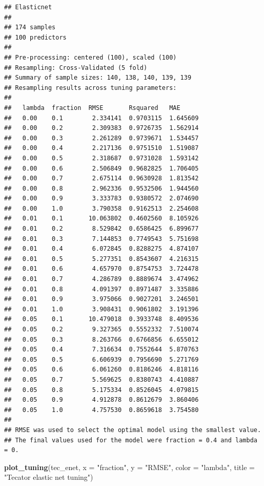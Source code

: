 \documentclass[
  11pt,
]{article}
\newenvironment{Shaded}{\begin{snugshade}}{\end{snugshade}}
\newcommand{\AttributeTok}[1]{\textcolor[rgb]{0.13,0.29,0.53}{#1}}
\newcommand{\FunctionTok}[1]{\textcolor[rgb]{0.13,0.29,0.53}{\textbf{#1}}}
\newcommand{\NormalTok}[1]{#1}
\newcommand{\StringTok}[1]{\textcolor[rgb]{0.31,0.60,0.02}{#1}}
\begin{document}
\begin{verbatim}
## Elasticnet 
## 
## 174 samples
## 100 predictors
## 
## Pre-processing: centered (100), scaled (100) 
## Resampling: Cross-Validated (5 fold) 
## Summary of sample sizes: 140, 138, 140, 139, 139 
## Resampling results across tuning parameters:
## 
##   lambda  fraction  RMSE       Rsquared   MAE     
##   0.00    0.1        2.334141  0.9703115  1.645609
##   0.00    0.2        2.309383  0.9726735  1.562914
##   0.00    0.3        2.261289  0.9739671  1.534457
##   0.00    0.4        2.217136  0.9751510  1.519087
##   0.00    0.5        2.318687  0.9731028  1.593142
##   0.00    0.6        2.506849  0.9682825  1.706405
##   0.00    0.7        2.675114  0.9630928  1.813542
##   0.00    0.8        2.962336  0.9532506  1.944560
##   0.00    0.9        3.333783  0.9380572  2.074690
##   0.00    1.0        3.790358  0.9162513  2.254608
##   0.01    0.1       10.063802  0.4602560  8.105926
##   0.01    0.2        8.529842  0.6586425  6.899677
##   0.01    0.3        7.144853  0.7749543  5.751698
##   0.01    0.4        6.072845  0.8288275  4.874107
##   0.01    0.5        5.277351  0.8543607  4.216315
##   0.01    0.6        4.657970  0.8754753  3.724478
##   0.01    0.7        4.286789  0.8889674  3.474962
##   0.01    0.8        4.091397  0.8971487  3.335886
##   0.01    0.9        3.975066  0.9027201  3.246501
##   0.01    1.0        3.908431  0.9061802  3.191396
##   0.05    0.1       10.479018  0.3933748  8.409536
##   0.05    0.2        9.327365  0.5552332  7.510074
##   0.05    0.3        8.263766  0.6766856  6.655012
##   0.05    0.4        7.316634  0.7552644  5.870763
##   0.05    0.5        6.606939  0.7956690  5.271769
##   0.05    0.6        6.061260  0.8186246  4.818116
##   0.05    0.7        5.569625  0.8380743  4.410887
##   0.05    0.8        5.175334  0.8526045  4.079815
##   0.05    0.9        4.912878  0.8612679  3.860406
##   0.05    1.0        4.757530  0.8659618  3.754580
## 
## RMSE was used to select the optimal model using the smallest value.
## The final values used for the model were fraction = 0.4 and lambda = 0.
\end{verbatim}

\begin{Shaded}
\begin{Highlighting}[]
\FunctionTok{plot\_tuning}\NormalTok{(tec\_enet, }\AttributeTok{x =} \StringTok{"fraction"}\NormalTok{, }\AttributeTok{y =} \StringTok{"RMSE"}\NormalTok{, }\AttributeTok{color =} \StringTok{"lambda"}\NormalTok{,}
            \AttributeTok{title =} \StringTok{"Tecator elastic net tuning"}\NormalTok{)}
\end{Highlighting}
\end{Shaded}
\end{document}
